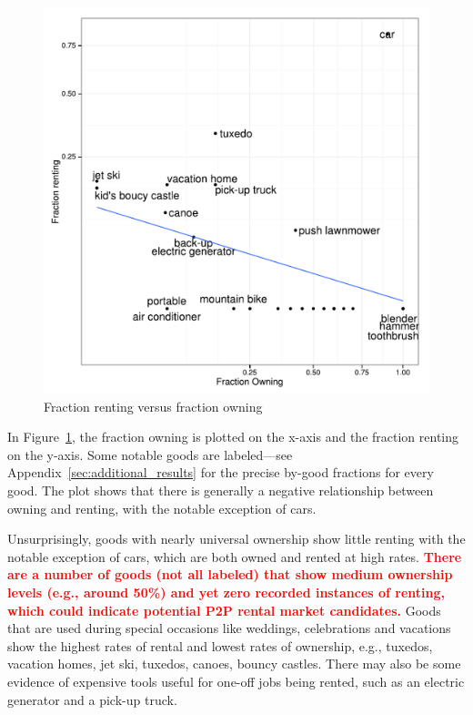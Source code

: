 \documentclass[11pt]{article}
\newcommand{\important}[1]{\textcolor{red}{\textbf{#1}}}
\newcommand{\important}[1]{#1}
\begin{document}
\begin{figure}
\centering 
\caption{Fraction renting versus fraction owning \label{fig:scatter} }
\begin{minipage}{0.60 \linewidth}
\includegraphics[width = \linewidth]{./plots/scatter_rent_v_own.pdf} 
\end{minipage} 
\end{figure} 

In Figure~\ref{fig:scatter}, the fraction owning is plotted on the x-axis and the fraction renting on the y-axis.
Some notable goods are labeled---see Appendix~\ref{sec:additional_results} for the precise by-good fractions for every good.
The plot shows that there is generally a negative relationship between owning and renting, with the notable exception of cars.

Unsurprisingly, goods with nearly universal ownership show little renting with the notable exception of cars, which are both owned and rented at high rates.  
\important{There are a number of goods (not all labeled) that show medium ownership levels (e.g., around 50\%) and yet zero recorded instances of renting, which could indicate potential P2P rental market candidates.} 
Goods that are used during special occasions like weddings, celebrations and vacations show the highest rates of rental and lowest rates of ownership, e.g., tuxedos, vacation homes, jet ski, tuxedos, canoes, bouncy castles. 
There may also be some evidence of expensive tools useful for one-off jobs being rented, such as an electric generator and a pick-up truck. 
\end{document}
